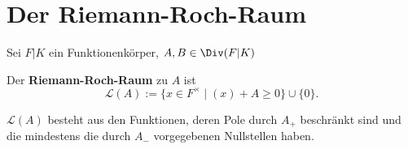 \section{Der Riemann-Roch-Raum}
Sei $F|K$ ein Funktionenkörper, $A,B \in \Div(F|K)$

\begin{definition}
    Der \textbf{Riemann-Roch-Raum} zu $A$ ist 
    $$ \mathcal{L}(A) := \{x \in F^{\times} \mid (x) + A \geq 0\} \cup \{0\}.$$
\end{definition}

\begin{bemerkungnr}
    $\mathcal{L}(A)$ besteht aus den Funktionen, deren Pole durch $A_+$ beschränkt sind und die mindestens die
    durch $A_-$ vorgegebenen Nullstellen haben.
\end{bemerkungnr}

